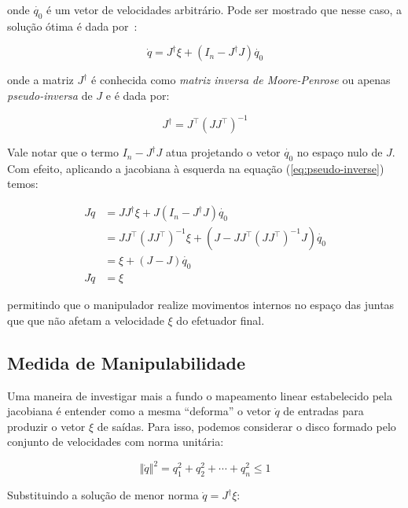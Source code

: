 onde \(\dot{q_0}\) é um vetor de velocidades arbitrário. Pode ser mostrado que nesse caso, 
a solução ótima é dada por~\cite{siciliano_robotics_2009}:

\begin{equation}\label{eq:pseudo-inverse}
    \dot{q} = J^\dag \xi + (I_n - J^\dag J) \dot{q_0}
\end{equation}

onde a matriz \(J^\dag\) é conhecida como \emph{matriz inversa de Moore-Penrose} ou apenas
\emph{pseudo-inversa} de \(J\) e é dada por:

\begin{equation}
    J^\dag = J^\top {(J J^\top)}^{-1}
\end{equation}

Vale notar que o termo \(I_n - J^\dag J\) atua projetando o vetor \(\dot{q_0}\)
no espaço nulo de \(J\). Com efeito, aplicando a jacobiana à esquerda na
equação (\ref{eq:pseudo-inverse}) temos:

\begin{align*}
    J \dot{q} & = J J^\dag \xi + J (I_n - J^\dag J) \dot{q_0}                                   \\
              & = J J^\top {(J J^\top)}^{-1} \xi + (J - J J^\top {(J J^\top)}^{-1} J) \dot{q_0} \\
              & = \xi + (J - J) \dot{q_0}                                                       \\
    J \dot{q} & = \xi
\end{align*}

permitindo que o manipulador realize movimentos internos no espaço das juntas
que que não afetam a velocidade \(\xi\) do efetuador final.

\subsection{Medida de Manipulabilidade}

Uma maneira de investigar mais a fundo o mapeamento linear estabelecido pela
jacobiana é entender como a mesma ``deforma'' o vetor \(\dot{q}\) de entradas
para produzir o vetor \(\xi\) de saídas. Para isso, podemos considerar o disco
formado pelo conjunto de velocidades com norma unitária:

\begin{equation}
    \left\Vert \dot{q} \right\Vert^2 = q_1^2 + q_2^2 + \cdots + q_n^2 \leq 1
\end{equation}

Substituindo a solução de menor norma \(\dot{q} = J^\dag \xi\):

